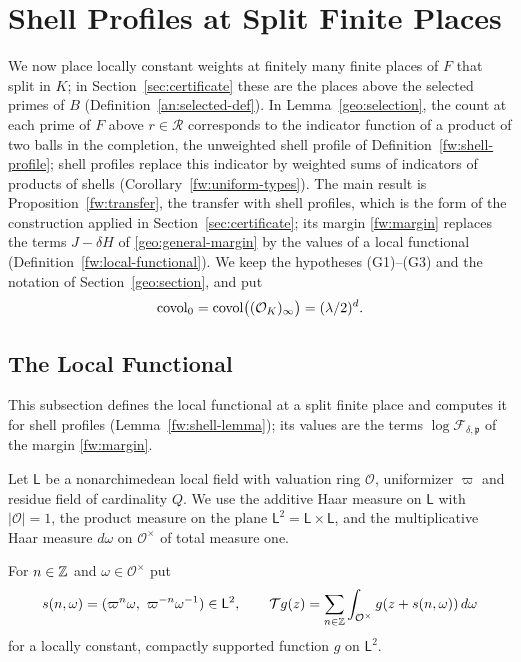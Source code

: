 \section{Shell Profiles at Split Finite Places}
\label{fw:section}

We now place locally constant weights at finitely many finite places of
$F$ that split in $K$; in Section~\ref{sec:certificate} these are the
places above the selected primes of $B$ (Definition~\ref{an:selected-def}).
In Lemma~\ref{geo:selection}, the count at each prime of $F$ above
$r\in\mathcal R$ corresponds to the indicator function of a product of
two balls in the completion, the unweighted shell profile of
Definition~\ref{fw:shell-profile}; shell profiles replace this indicator
by weighted sums of indicators of products of shells
(Corollary~\ref{fw:uniform-types}). The main result is
Proposition~\ref{fw:transfer}, the transfer with shell profiles, which is the
form of the construction applied in Section~\ref{sec:certificate}; its
margin \eqref{fw:margin} replaces the terms $J-\delta H$ of
\eqref{geo:general-margin} by the values of a local functional
(Definition~\ref{fw:local-functional}). We keep the hypotheses (G1)--(G3)
and the notation of Section~\ref{geo:section}, and put
\[
 \operatorname{covol}_0=\operatorname{covol}\bigl((\mathcal O_K)_\infty\bigr)=(\lambda/2)^d .
\]

\subsection{The Local Functional}\label{fw:local-subsection}

This subsection defines the local functional at a split finite place and
computes it for shell profiles (Lemma~\ref{fw:shell-lemma}); its values are
the terms $\log\mathcal F_{\delta,\mathfrak p}$ of the margin
\eqref{fw:margin}.

Let $\mathsf L$ be a nonarchimedean local field with valuation ring $\mathcal
O$, uniformizer $\varpi$ and residue field of cardinality $Q$. We use
the additive Haar measure on $\mathsf L$ with $|\mathcal O|=1$, the product
measure on the plane $\mathsf L^2=\mathsf L\times\mathsf L$, and the
multiplicative Haar measure $d\omega$ on $\mathcal O^\times$ of total
measure one.

\begin{definition}\label{fw:shift-operator}
For $n\in\mathbb Z$ and $\omega\in\mathcal O^\times$ put
\[
 s(n,\omega)=(\varpi^n\omega,\ \varpi^{-n}\omega^{-1})\in\mathsf L^2,\qquad
 \mathcal Tg(z)=\sum_{n\in\Z}\int_{\mathcal O^\times}g(z+s(n,\omega))\,d\omega
\]
for a locally constant, compactly supported function $g$ on $\mathsf L^2$.
\end{definition}

